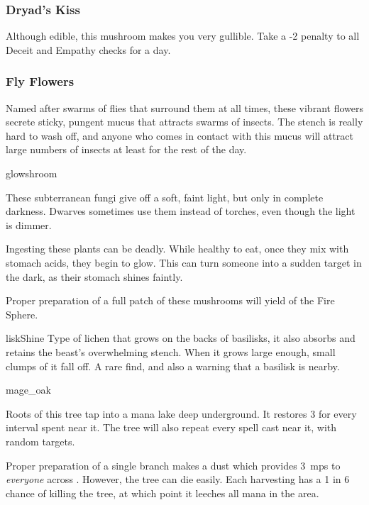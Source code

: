 \begin{multicols}{2}
\subsubsection{Dryad's Kiss}
\label{dryads_kiss}

Although edible, this mushroom makes you very gullible.
Take a -2 penalty to all Deceit and Empathy checks for a day.

\subsubsection{Fly Flowers}
\label{fly_flowers}

Named after swarms of flies that surround them at all times, these vibrant flowers secrete sticky, pungent mucus that attracts swarms of insects.
The stench is really hard to wash off, and anyone who comes in contact with this mucus will attract large numbers of insects at least for the rest of the day.

%
  {glowshroom}%
  {
   These subterranean fungi give off a soft, faint light, but only in complete darkness.
   Dwarves sometimes use them instead of torches, even though the light is dimmer.

   Ingesting these plants can be deadly.
   While healthy to eat, once they mix with stomach acids, they begin to glow.
   This can turn someone into a sudden target in the dark, as their stomach shines faintly.

   Proper preparation of a full patch of these mushrooms will yield  of the Fire Sphere.
    }

%
  {liskShine}%
  {Type of lichen that grows on the backs of basilisks, it also absorbs and retains the beast's overwhelming stench.
  When it grows large enough, small clumps of it fall off.
  A rare find, and also a warning that a basilisk is nearby.
    }

%
  {mage_oak}%
  {
    Roots of this tree tap into a mana lake deep underground.
    It restores 3  for every \gls{interval} spent near it.
    The tree will also repeat every spell cast near it, with random targets.

    Proper preparation of a single branch makes a dust which provides 3~\glspl{mp} to \emph{everyone} across .
    However, the tree can die easily.
    Each harvesting has a 1 in 6 chance of killing the tree, at which point it leeches all mana in the \gls{area}.
  }%



\end{multicols}
